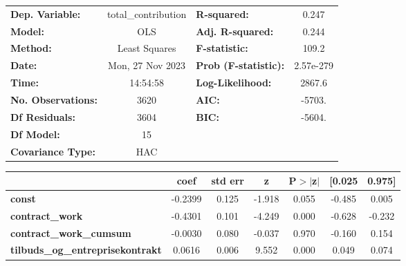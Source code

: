 \begin{center}
\begin{tabular}{lclc}
\toprule
\textbf{Dep. Variable:}                     & total\_contribution & \textbf{  R-squared:         } &     0.247   \\
\textbf{Model:}                             &         OLS         & \textbf{  Adj. R-squared:    } &     0.244   \\
\textbf{Method:}                            &    Least Squares    & \textbf{  F-statistic:       } &     109.2   \\
\textbf{Date:}                              &   Mon, 27 Nov 2023  & \textbf{  Prob (F-statistic):} & 2.57e-279   \\
\textbf{Time:}                              &       14:54:58      & \textbf{  Log-Likelihood:    } &    2867.6   \\
\textbf{No. Observations:}                  &          3620       & \textbf{  AIC:               } &    -5703.   \\
\textbf{Df Residuals:}                      &          3604       & \textbf{  BIC:               } &    -5604.   \\
\textbf{Df Model:}                          &            15       & \textbf{                     } &             \\
\textbf{Covariance Type:}                   &         HAC         & \textbf{                     } &             \\
\bottomrule
\end{tabular}
\begin{tabular}{lcccccc}
                                            & \textbf{coef} & \textbf{std err} & \textbf{z} & \textbf{P$> |$z$|$} & \textbf{[0.025} & \textbf{0.975]}  \\
\midrule
\textbf{const}                              &      -0.2399  &        0.125     &    -1.918  &         0.055        &       -0.485    &        0.005     \\
\textbf{contract\_work}                     &      -0.4301  &        0.101     &    -4.249  &         0.000        &       -0.628    &       -0.232     \\
\textbf{contract\_work\_cumsum}             &      -0.0030  &        0.080     &    -0.037  &         0.970        &       -0.160    &        0.154     \\
\textbf{tilbuds\_og\_entreprisekontrakt}    &       0.0616  &        0.006     &     9.552  &         0.000        &        0.049    &        0.074     \\

\end{tabular}
\end{center}
